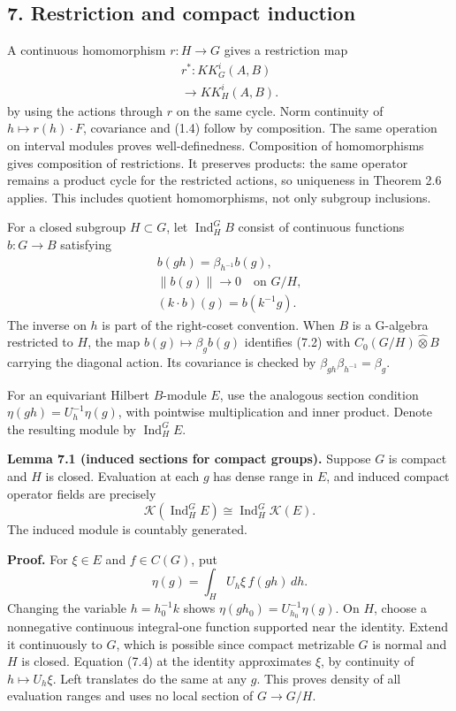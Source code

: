 \documentclass[
  11pt,
]{article}
\begin{document}
\subsection{7. Restriction and compact
induction}\label{restriction-and-compact-induction}

A continuous homomorphism \(r:H\to G\) gives a restriction map \[
\begin{gathered}
r^*:KK_G^i(A,B)\\
\longrightarrow KK_H^i(A,B).
\end{gathered}
\tag{7.1}
\] by using the actions through \(r\) on the same cycle. Norm continuity
of \(h\mapsto r(h)\cdot F\), covariance and (1.4) follow by composition.
The same operation on interval modules proves well-definedness.
Composition of homomorphisms gives composition of restrictions. It
preserves products: the same operator remains a product cycle for the
restricted actions, so uniqueness in Theorem 2.6 applies. This includes
quotient homomorphisms, not only subgroup inclusions.

For a closed subgroup \(H\subset G\), let \(\operatorname{Ind}_H^G B\)
consist of continuous functions \(b:G\to B\) satisfying \[
\begin{gathered}
b(gh)=\beta_{h^{-1}}b(g),\\
\|b(g)\|\longrightarrow0\quad\text{on }G/H,\\
(k\cdot b)(g)=b(k^{-1}g).
\end{gathered}
\tag{7.2}
\] The inverse on \(h\) is part of the right-coset convention. When
\(B\) is a G-algebra restricted to \(H\), the map
\(b(g)\mapsto\beta_g b(g)\) identifies (7.2) with
\(C_0(G/H)\widehat\otimes B\) carrying the diagonal action. Its
covariance is checked by \(\beta_{gh}\beta_{h^{-1}}=\beta_g\).

For an equivariant Hilbert \(B\)-module \(E\), use the analogous section
condition \(\eta(gh)=U_h^{-1}\eta(g)\), with pointwise multiplication
and inner product. Denote the resulting module by
\(\operatorname{Ind}_H^G E\).

\textbf{Lemma 7.1 (induced sections for compact groups).} Suppose \(G\)
is compact and \(H\) is closed. Evaluation at each \(g\) has dense range
in \(E\), and induced compact operator fields are precisely \[
\mathcal K(\operatorname{Ind}_H^G E)
 \cong\operatorname{Ind}_H^G\mathcal K(E).
\tag{7.3}
\] The induced module is countably generated.

\textbf{Proof.} For \(\xi\in E\) and \(f\in C(G)\), put \[
\eta(g)=\int_H U_h\xi\,f(gh)\,dh.
\tag{7.4}
\] Changing the variable \(h=h_0^{-1}k\) shows
\(\eta(gh_0)=U_{h_0}^{-1}\eta(g)\). On \(H\), choose a nonnegative
continuous integral-one function supported near the identity. Extend it
continuously to \(G\), which is possible since compact metrizable \(G\)
is normal and \(H\) is closed. Equation (7.4) at the identity
approximates \(\xi\), by continuity of \(h\mapsto U_h\xi\). Left
translates do the same at any \(g\). This proves density of all
evaluation ranges and uses no local section of \(G\to G/H\).
\end{document}
